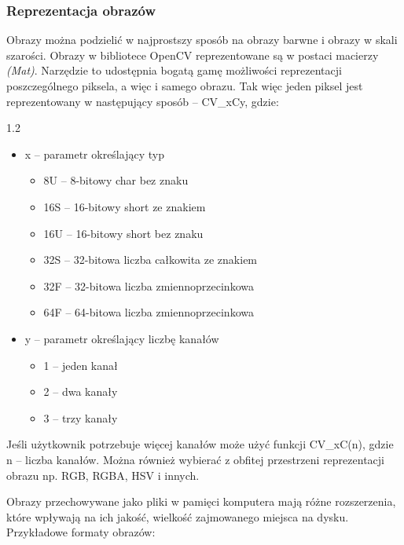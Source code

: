 \documentclass[a4paper,12pt]{article}
\newcommand\spacingInSolemnItemize{1.2}
\newcommand\spacingIndent{2.2em}
\begin{document}
    	\subsubsection{Reprezentacja obrazów}
			\hspace{\spacingIndent} Obrazy można podzielić w najprostszy sposób na obrazy barwne i obrazy w skali szarości. Obrazy w bibliotece OpenCV 
				reprezentowane są w postaci macierzy \textit{(Mat)}. Narzędzie to udostępnia bogatą gamę możliwości reprezentacji poszczególnego piksela, 
				a więc i samego obrazu. Tak więc jeden piksel jest reprezentowany w następujący sposób -- CV\_xCy, gdzie:
			
				\begin{spacing}{\spacingInSolemnItemize}
					\begin{itemize}
						\item{x -- parametr określający typ}
							\begin{itemize}
								\item{8U -- 8-bitowy char bez znaku}
								\item{16S -- 16-bitowy short ze znakiem}
								\item{16U -- 16-bitowy short bez znaku}
								\item{32S -- 32-bitowa liczba całkowita ze znakiem}
								\item{32F -- 32-bitowa liczba zmiennoprzecinkowa}
								\item{64F -- 64-bitowa liczba zmiennoprzecinkowa}
							\end{itemize}
						\item{y  -- parametr określający liczbę kanałów}
							\begin{itemize}
								\item{1 -- jeden kanał}
								\item{2 -- dwa kanały}
								\item{3 -- trzy kanały}
							\end{itemize}
					\end{itemize}	
				\end{spacing} Jeśli użytkownik potrzebuje więcej kanałów może użyć funkcji CV\_xC(n), gdzie n -- liczba kanałów. Można również wybierać 
				z obfitej przestrzeni reprezentacji obrazu np. RGB, RGBA, HSV i innych. 
			
			 Obrazy przechowywane jako pliki w pamięci komputera mają różne rozszerzenia, które wpływają na ich jakość, 
				wielkość zajmowanego miejsca na dysku. Przykładowe formaty obrazów: 
			
\end{document}
